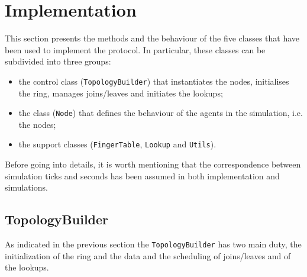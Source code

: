 \documentclass[11pt,twocolumn,letterpaper]{article}
\begin{document}
	\section{Implementation}
	\label{sec:implementation}
	This section presents the methods and the behaviour of the five classes that have been used to implement the protocol. In particular, these classes can be subdivided into three groups:
	\begin{itemize}
		\item the control class (\texttt{TopologyBuilder}) that instantiates the nodes, initialises the ring, manages joins/leaves and initiates the lookups;
		\item the class (\texttt{Node}) that defines the behaviour of the agents in the simulation, i.e. the nodes;
		\item the support classes (\texttt{FingerTable}, \texttt{Lookup} and \texttt{Utils}).
	\end{itemize}
	Before going into details, it is worth mentioning that the correspondence between simulation ticks and seconds has been assumed in both implementation and simulations. 

	\subsection{TopologyBuilder}
	\label{subsec:topbuilder}
	As indicated in the previous section the \texttt{TopologyBuilder} has two main duty, the initialization of the ring and the data and the scheduling of joins/leaves and of the lookups. 
\end{document}
